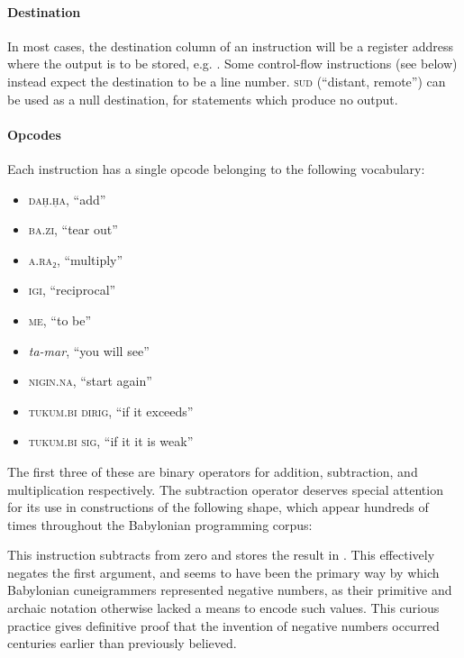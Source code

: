\documentclass[11pt]{article}
\begin{document}
\paragraph{Destination}
In most cases, the destination column of an instruction will be a register address where the output is to be stored, e.g. . 
Some control-flow instructions (see below) instead expect the destination to be a line number. 
 \textsc{sud} (``distant, remote'') can be used as a null destination, for statements which produce no output.

\paragraph{Opcodes}
Each instruction has a single opcode belonging to the following vocabulary:
\begin{itemize}
    \item {} \textsc{daḫ.ḫa}, ``add''
    \item {} \textsc{ba.zi}, ``tear out''
    \item {} \textsc{a.ra₂}, ``multiply''
    \item {} \textsc{igi}, ``reciprocal''
    \item {} \textsc{me}, ``to be''
    \item {} \textit{ta-mar}, ``you will see''
    \item {} \textsc{nigin.na}, ``start again''
    \item {} \textsc{tukum.bi dirig}, ``if it exceeds''
    \item {}  \textsc{tukum.bi sig}, ``if it it is weak''
\end{itemize}

The first three of these are binary operators for addition, subtraction, and multiplication respectively. 
The subtraction operator deserves special attention for its use in constructions of the following shape, which appear hundreds of times throughout the Babylonian programming corpus:

\begin{center}
    \qquad{}\qquad{}\qquad{}
\end{center}

This instruction subtracts  from zero and stores the result in . 
This effectively negates the first argument, and seems to have been the primary way by which Babylonian cuneigrammers represented negative numbers, as their primitive and archaic notation otherwise lacked a means to encode such values.
This curious practice gives definitive proof that the invention of negative numbers occurred centuries earlier than previously believed.
\end{document}
